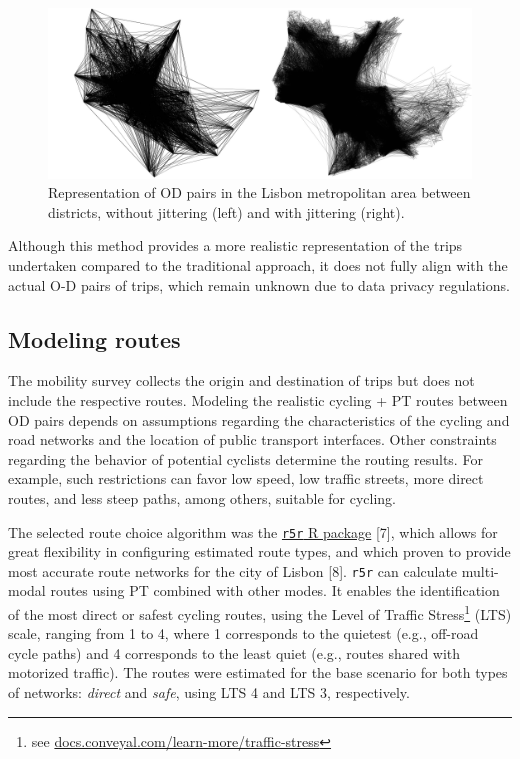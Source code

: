 \documentclass[runningheads]{llncs}
\begin{document}
\begin{figure}

{\centering \includegraphics[width=1\linewidth,]{img/jitter} 

}

\caption{Representation of OD pairs in the Lisbon metropolitan area between districts, without jittering (left) and with jittering (right).}\label{fig:jitter}
\end{figure}

Although this method provides a more realistic representation of the
trips undertaken compared to the traditional approach, it does not fully
align with the actual O-D pairs of trips, which remain unknown due to
data privacy regulations.

\hypertarget{modeling-routes}{%
\subsection{Modeling routes}\label{modeling-routes}}

The mobility survey collects the origin and destination of trips but
does not include the respective routes. Modeling the realistic cycling +
PT routes between OD pairs depends on assumptions regarding the
characteristics of the cycling and road networks and the location of
public transport interfaces. Other constraints regarding the behavior of
potential cyclists determine the routing results. For example, such
restrictions can favor low speed, low traffic streets, more direct
routes, and less steep paths, among others, suitable for cycling.

The selected route choice algorithm was the
\href{https://ipeagit.github.io/r5r/}{\texttt{r5r} R package} {[}7{]},
which allows for great flexibility in configuring estimated route types,
and which proven to provide most accurate route networks for the city of
Lisbon {[}8{]}. \texttt{r5r} can calculate multi-modal routes using PT
combined with other modes. It enables the identification of the most
direct or safest cycling routes, using the Level of Traffic
Stress\footnote{see
  \href{https://docs.conveyal.com/learn-more/traffic-stress}{docs.conveyal.com/learn-more/traffic-stress}}
(LTS) scale, ranging from 1 to 4, where 1 corresponds to the quietest
(e.g., off-road cycle paths) and 4 corresponds to the least quiet (e.g.,
routes shared with motorized traffic). The routes were estimated for the
base scenario for both types of networks: \emph{direct} and \emph{safe},
using LTS 4 and LTS 3, respectively.
\end{document}
